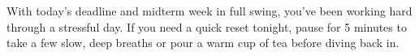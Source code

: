 With today's deadline and midterm week in full swing, you've been working hard through a stressful day. If you need a quick reset tonight, pause for 5 minutes to take a few slow, deep breaths or pour a warm cup of tea before diving back in.